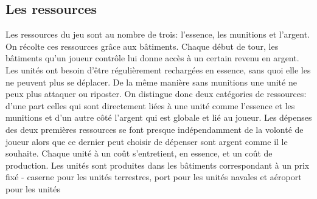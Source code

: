 \documentclass[a4paper,10pt]{article} %
\begin{document}
\subsection{Les ressources}
Les ressources du jeu sont au nombre de trois: l'essence, les munitions et l'argent. On récolte ces ressources grâce aux bâtiments. Chaque début de tour, les bâtiments qu'un joueur contrôle lui donne accès à un certain revenu en argent. Les unités ont besoin d'être régulièrement rechargées en essence, sans quoi elle les ne peuvent plus se déplacer. De la même manière sans munitions une unité ne peux plus attaquer ou riposter. On distingue donc deux catégories de ressources: d'une part celles qui sont directement liées à une unité comme l'essence et les munitions et d'un autre côté l'argent qui est globale et lié au joueur. Les dépenses des deux premières ressources se font presque indépendamment de la volonté de joueur alors que ce dernier peut choisir de dépenser sont argent comme il le souhaite. Chaque unité à un coût s'entretient, en essence, et un coût de production. Les unités sont produites dans les bâtiments correspondant à un prix fixé - caserne pour les unités terrestres, port pour les unités navales et aéroport pour les unités 
\end{document}
